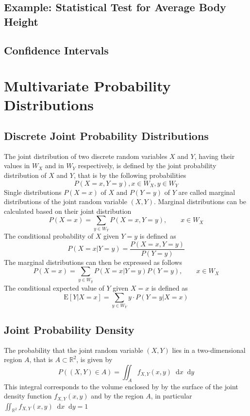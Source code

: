 \documentclass[11pt]{article}
\theoremstyle{definition}
\newcommand*\ev[1]{\mathrel{\text{E}\left[#1\right]}}
\newcommand*\R{\mathbb{R}}
\newcommand*\diff{\mathop{}\!\mathrm{d}}
\begin{document}
\subsection{Example: Statistical Test for Average Body Height}



\subsection{Confidence Intervals}


\section{Multivariate Probability Distributions}

\subsection{Discrete Joint Probability Distributions}
The joint distribution of two discrete random variables $X$ and $Y$, having their values in $W_X$ and in $W_Y$ respectively, is defined by the joint probability distribution of $X$ and $Y$, that is by the following probabilities
\begin{equation*}
	P(X=x, Y=y), x\in W_X, y\in W_Y
\end{equation*}
Single distributions $P(X = x)$ of $X$ and $P(Y = y)$ of $Y$ are called marginal distributions of the joint random variable $(X,Y)$. Marginal distributions can be calculated based on their joint distribution
\begin{equation*}
	P(X=x) = \sum_{y\in W_Y} P(X = x, Y = y),\qquad x\in W_X
\end{equation*}
The conditional probability of $X$ given $Y=y$ is defined as
\begin{equation*}
	P(X = x | Y = y) = \frac{P(X = x, Y = y)}{P(Y=y)}
\end{equation*}
The marginal distributions can then be expressed as follows
\begin{equation*}
	P(X=x) = \sum_{y\in W_y} P(X=x|Y=y)P(Y=y),\qquad x\in W_X
\end{equation*}
The conditional expected value of $Y$ given $X=x$ is defined as
\begin{equation*}
	\ev{Y|X=x} = \sum_{y\in W_Y} y\cdot P(Y=y|X=x)
\end{equation*}

\subsection{Joint Probability Density}
The probability that the joint random variable $(X,Y)$ lies in a two-dimensional region $A$, that is $A\subset \R^2$, is given by
\begin{equation*}
	P\left( (X,Y) \in A \right) = \iint_{A} f_{X,Y}(x,y) \diff x \diff y
\end{equation*}
This integral corresponds to the volume enclosed by by the surface of the joint density function $f_{X,Y}(x,y)$ and by the region $A$, in particular $\iint_{\R^2} f_{X,Y}(x,y) \diff x\diff y = 1$
\end{document}
